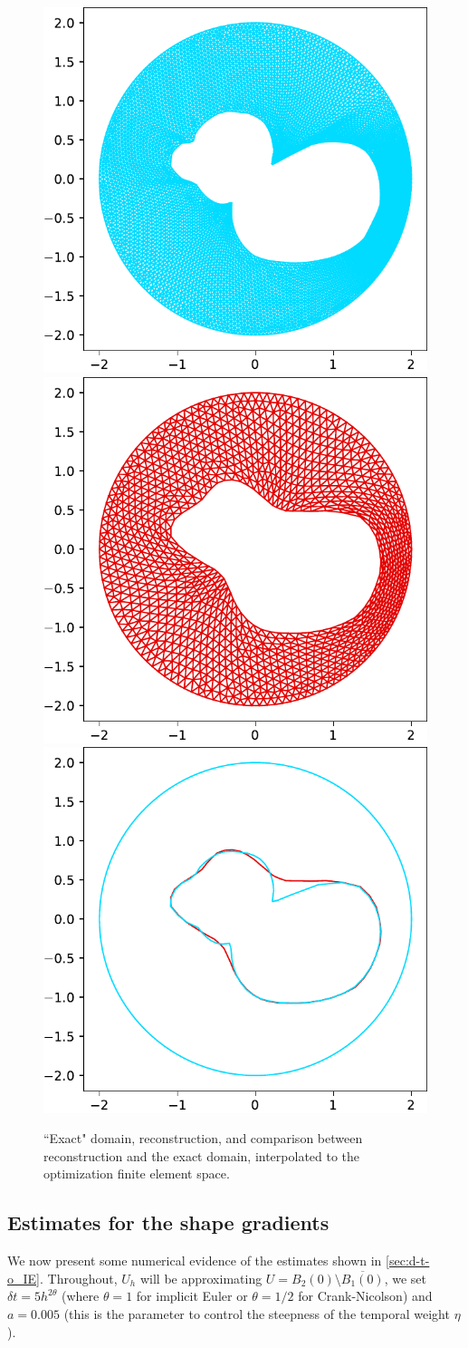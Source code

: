 \documentclass[english,a4paper,10pt,oneside]{scrbook}	%
\theoremstyle{break}
\theoremstyle{remark}
\newcommand{\tred}[1]{\textcolor{red}{#1}}
\begin{document}
\begin{figure}[H]
\centering
\includegraphics[height=0.3\columnwidth]{Images/duck/exact_domain.pdf}
\includegraphics[height=0.3\columnwidth]{Images/duck/estimated_domain.pdf}
\includegraphics[height=0.3\columnwidth]{Images/duck/comparison.pdf}
\caption{``Exact" domain, reconstruction, and comparison between reconstruction and the exact domain, interpolated to the optimization finite element space.}\label{fig:duck}
\end{figure}


\subsection{Estimates for the shape gradients}

We now present some numerical evidence of the estimates shown in \cref{sec:d-t-o_IE}. Throughout, $U_h$ will be approximating $U = B_2(0)\setminus \overline{B_1(0)}$, we set $\delta t = 5 h^{2\theta}$ (where $\theta=1$ for implicit Euler or $\theta=1/2$ for Crank-Nicolson) and $a = 0.005$ (this is the parameter to control the steepness of the temporal weight $\eta$).
\end{document}
